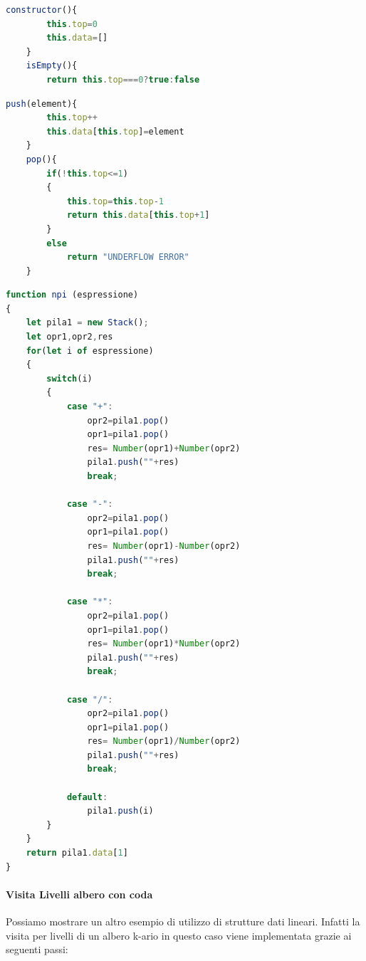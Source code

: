 \documentclass{article}
\begin{document}
\begin{lstlisting}[language=JavaScript]
    constructor(){
        this.top=0
        this.data=[]
    }
    isEmpty(){
        return this.top===0?true:false
\end{lstlisting}

\begin{lstlisting}[language=JavaScript]
    push(element){
        this.top++
        this.data[this.top]=element
    }
    pop(){
        if(!this.top<=1)
        {
            this.top=this.top-1
            return this.data[this.top+1]
        }
        else
            return "UNDERFLOW ERROR"
    }
\end{lstlisting}

\newpage

\begin{lstlisting}[language=JavaScript]
function npi (espressione)
{
    let pila1 = new Stack();
    let opr1,opr2,res
    for(let i of espressione)
    {
        switch(i)
        {
            case "+":
                opr2=pila1.pop()
                opr1=pila1.pop()
                res= Number(opr1)+Number(opr2)
                pila1.push(""+res)
                break;

            case "-":
                opr2=pila1.pop()
                opr1=pila1.pop()
                res= Number(opr1)-Number(opr2)
                pila1.push(""+res)
                break;

            case "*":
                opr2=pila1.pop()
                opr1=pila1.pop()
                res= Number(opr1)*Number(opr2)
                pila1.push(""+res)
                break;

            case "/":
                opr2=pila1.pop()
                opr1=pila1.pop()
                res= Number(opr1)/Number(opr2)
                pila1.push(""+res)
                break;

            default:
                pila1.push(i)
        }
    }
    return pila1.data[1]
} 
\end{lstlisting}


\newpage

\paragraph{Visita Livelli albero con coda} Possiamo mostrare un altro esempio di utilizzo di strutture dati lineari. Infatti la visita per livelli di un albero k-ario in questo caso viene implementata grazie ai seguenti passi:
\end{document}

